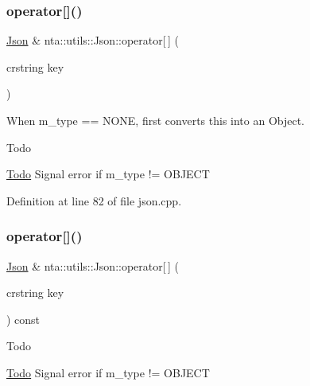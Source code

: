 \mbox{\label{classnta_1_1utils_1_1Json_adf2d340a2bf7d59c537e398a1be66cf7}} 
\subsubsection{\texorpdfstring{operator[]()}{operator[]()}\hspace{0.1cm}{\footnotesize\ttfamily [1/4]}}
{\footnotesize\ttfamily \hyperlink{classnta_1_1utils_1_1Json}{Json} \& nta\+::utils\+::\+Json\+::operator\mbox{[}$\,$\mbox{]} (\begin{DoxyParamCaption}\item[{crstring}]{key }\end{DoxyParamCaption})}



When m\+\_\+type == N\+O\+NE, first converts this into an Object. 

\begin{DoxyRefDesc}{Todo}
\item[\hyperlink{todo__todo000018}{Todo}]Signal error if m\+\_\+type != O\+B\+J\+E\+CT \end{DoxyRefDesc}


Definition at line 82 of file json.\+cpp.

\mbox{\label{classnta_1_1utils_1_1Json_ab3b51a07ebed90330c98fd8e20785781}} 
\subsubsection{\texorpdfstring{operator[]()}{operator[]()}\hspace{0.1cm}{\footnotesize\ttfamily [2/4]}}
{\footnotesize\ttfamily \hyperlink{classnta_1_1utils_1_1Json}{Json} \& nta\+::utils\+::\+Json\+::operator\mbox{[}$\,$\mbox{]} (\begin{DoxyParamCaption}\item[{crstring}]{key }\end{DoxyParamCaption}) const}

\begin{DoxyRefDesc}{Todo}
\item[\hyperlink{todo__todo000019}{Todo}]Signal error if m\+\_\+type != O\+B\+J\+E\+CT \end{DoxyRefDesc}


